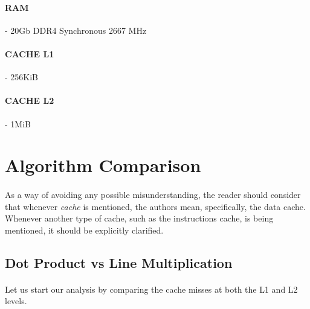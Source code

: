 \documentclass{report}
\begin{document}
			\paragraph{RAM}- 20Gb DDR4 Synchronous 2667 MHz
			\paragraph{CACHE L1}- 256KiB
			\paragraph{CACHE L2}- 1MiB 
			
		\section{Algorithm Comparison}
		
			\paragraph{}As a way of avoiding any possible misunderstanding, the reader should consider that whenever \emph{cache} is mentioned, the authors mean, specifically, the data cache. Whenever another type of cache, such as the instructions cache, is being mentioned, it should be explicitly clarified.
		
			\subsection{Dot Product vs Line Multiplication}
			
				\paragraph{}Let us start our analysis by comparing the cache misses at both the L1 and L2 levels.
			
\end{document}
